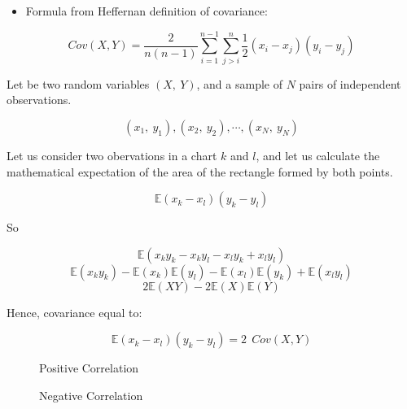 \documentclass[
]{report}
\providecommand{\tightlist}{%
  \setlength{\itemsep}{0pt}\setlength{\parskip}{0pt}}
\begin{document}
\begin{itemize}
\tightlist
\item
  Formula from Heffernan definition of covariance:
\end{itemize}

\[
Cov(X,Y)= \frac{2}{n(n-1)}\sum_{i=1}^{n-1}\sum_{j>i}^{n}\frac{1}{2}(x_i-x_j)(y_i - y_j)
\]

Let be two random variables \((X,~Y)\), and a sample of \(N\) pairs of independent observations.

\[(x_1,~y_1),(x_2,~y_2),\dotsi, (x_N,~y_N)\]

Let us consider two obervations in a chart \(k\) and \(l\), and let us calculate the mathematical expectation of the area of the rectangle formed by both points.

\[\mathbb{E}(x_k-x_l)(y_k-y_l)\]

So

\[\mathbb{E}(x_ky_k-x_ky_l-x_ly_k+x_ly_l)\]
\[\mathbb{E}(x_ky_k) -\mathbb{E}(x_k)\mathbb{E}(y_l) -\mathbb{E}(x_l)\mathbb{E}(y_k)+ \mathbb{E}(x_ly_l)\]
\[2\mathbb{E}(XY)-2\mathbb{E}(X)\mathbb{E}(Y)\]

Hence, covariance equal to:

\[\mathbb{E}(x_k-x_l)(y_k-y_l)= 2~~ Cov(X,Y)\]

\begin{paracol}{2}
    \begin{leftcolumn}
\begin{figure}[H] 
\caption{Positive Correlation}
\end{figure}
 \end{leftcolumn}
  \begin{rightcolumn} %
  \begin{figure}[H]
\caption{Negative Correlation}
\end{figure}
    \end{rightcolumn}
\end{paracol}
\end{document}
